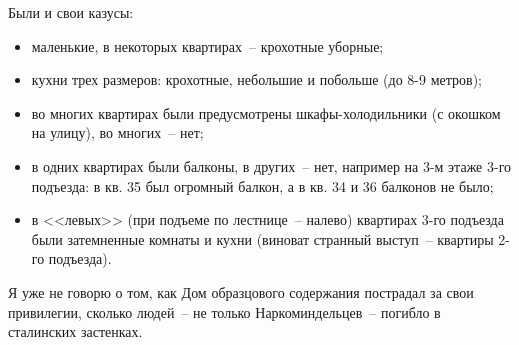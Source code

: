 Были и свои казусы:
\begin{itemize}
\item маленькие, в некоторых квартирах~-- крохотные уборные;
\item кухни трех размеров: крохотные, небольшие и побольше (до 8-9 метров);
\item во многих квартирах были предусмотрены шкафы-холодильники (с окошком на улицу), во многих~-- нет;
\item в одних квартирах были балконы, в других~-- нет, например на 3-м этаже 3-го подъезда: в кв. 35 был огромный балкон, а в кв. 34 и 36 балконов не было;
\item в <<левых>> (при подъеме по лестнице~-- налево) квартирах 3-го подъезда были затемненные комнаты и кухни (виноват странный выступ~-- квартиры 2-го подъезда). 
\end{itemize}

Я уже не говорю о том, как Дом образцового содержания пострадал за свои привилегии, сколько людей~-- не только Наркоминдельцев~-- погибло в сталинских застенках.
